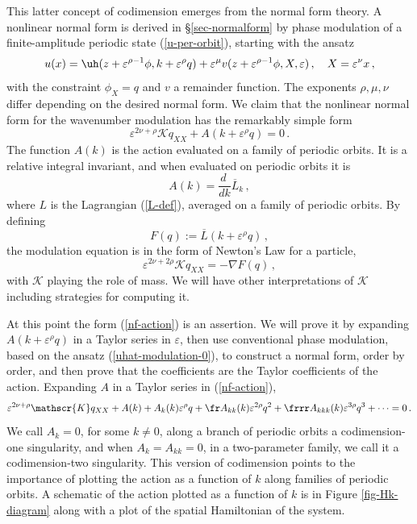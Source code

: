 \documentclass[10pt]{article}
\def\eps{{\varepsilon}} \def\reps{\textcolor{red}{{\varepsilon}}}
\begin{document}
This latter concept of codimension emerges from the normal form theory.  A
nonlinear normal form is derived in \S\ref{sec-normalform} by phase modulation
of a finite-amplitude periodic state (\ref{u-per-orbit}), starting with the
ansatz
%
\begin{equation}\label{uhat-modulation-0}
u(x) = \uh(z+\eps^{\rho-1}\phi,k+\eps^{\rho} q) + \eps^\mu v(z+\eps^{\rho-1}\phi,X,\eps)\,,\quad X=\eps^\nu x\,,
\end{equation}
%
with the constraint $\phi_X=q$ and $v$ a remainder function. The exponents
$\rho,\mu,\nu$ differ depending on the desired normal form. We claim that the nonlinear
normal form for the wavenumber modulation has the remarkably simple form
%
\begin{equation}\label{nf-action}
\eps^{2\nu+\rho}\mathscr{K} q_{XX} + A(k+\eps^{\rho}q) = 0 \,.
\end{equation}
%
The function $A(k)$ is the action evaluated on a family of periodic orbits.  It
is a relative integral invariant, and when evaluated on periodic orbits it is
%
\begin{equation}\label{A-lagr-formula}
A(k) = \frac{d\ }{dk} \overline{L}_k\,,
\end{equation}
%
where $L$ is the Lagrangian (\ref{L-def}), averaged on a family of periodic
orbits. By defining 
\[
F(q) := \overline{L}(k+\eps^\rho q)\,,
\]
the modulation equation is in the form of Newton's Law for a particle, 
\[
\eps^{2\nu+2\rho}\mathscr{K} q_{XX} = - \nabla F(q)\,,
\]
with $\mathscr{K}$ playing the role of mass.  We will have other interpretations
of $\mathscr{K}$ including strategies for computing it.

At this point the form (\ref{nf-action}) is an assertion.  We will prove it by
expanding $A(k+\eps^\rho q)$ in a Taylor series in $\eps$, then use conventional
phase modulation, based on the ansatz (\ref{uhat-modulation-0}), to construct a
normal form, order by order, and then prove that the coefficients are the Taylor
coefficients of the action. Expanding $A$ in a Taylor series in
(\ref{nf-action}),
%
\begin{equation}\label{nf-action-taylor}
\eps^{2\nu+\rho}\mathscr{K} q_{XX} + A(k) + A_k(k)\eps^{\rho}q + \fr A_{kk}(k)\eps^{2\rho}q^2 + \frrr A_{kkk}(k)\eps^{3\rho}q^3 + \cdots = 0 \,.
\end{equation}
We call $A_k=0$, for some $k\neq0$, along a branch of periodic orbits a
codimension-one singularity, and when $A_k=A_{kk}=0$, in a two-parameter family, we call
it a codimension-two singularity. This version of codimension points to the
importance of plotting the action as a function of $k$ along families of
periodic orbits.  A schematic of the action plotted as a function of $k$ is in
Figure \ref{fig-Hk-diagram} along with a plot of the spatial Hamiltonian of the system. 
\end{document}
